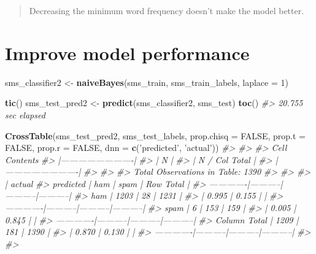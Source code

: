 \documentclass[]{book}
\newenvironment{Shaded}{\begin{snugshade}}{\end{snugshade}}
\newcommand{\CommentTok}[1]{\textcolor[rgb]{0.56,0.35,0.01}{\textit{#1}}}
\newcommand{\DataTypeTok}[1]{\textcolor[rgb]{0.13,0.29,0.53}{#1}}
\newcommand{\DecValTok}[1]{\textcolor[rgb]{0.00,0.00,0.81}{#1}}
\newcommand{\KeywordTok}[1]{\textcolor[rgb]{0.13,0.29,0.53}{\textbf{#1}}}
\newcommand{\NormalTok}[1]{#1}
\newcommand{\OtherTok}[1]{\textcolor[rgb]{0.56,0.35,0.01}{#1}}
\newcommand{\StringTok}[1]{\textcolor[rgb]{0.31,0.60,0.02}{#1}}
\begin{document}
\begin{quote}
Decreasing the minimum word frequency doesn't make the model better.
\end{quote}

\hypertarget{improve-model-performance}{%
\section{Improve model performance}\label{improve-model-performance}}

\begin{Shaded}
\begin{Highlighting}[]
\NormalTok{sms_classifier2 <-}\StringTok{ }\KeywordTok{naiveBayes}\NormalTok{(sms_train, sms_train_labels, }
                              \DataTypeTok{laplace =} \DecValTok{1}\NormalTok{)}
\end{Highlighting}
\end{Shaded}

\begin{Shaded}
\begin{Highlighting}[]
\KeywordTok{tic}\NormalTok{()}
\NormalTok{sms_test_pred2 <-}\StringTok{ }\KeywordTok{predict}\NormalTok{(sms_classifier2, sms_test)}
\KeywordTok{toc}\NormalTok{()}
\CommentTok{#> 20.755 sec elapsed}
\end{Highlighting}
\end{Shaded}

\begin{Shaded}
\begin{Highlighting}[]
\KeywordTok{CrossTable}\NormalTok{(sms_test_pred2, sms_test_labels,}
    \DataTypeTok{prop.chisq =} \OtherTok{FALSE}\NormalTok{, }\DataTypeTok{prop.t =} \OtherTok{FALSE}\NormalTok{, }\DataTypeTok{prop.r =} \OtherTok{FALSE}\NormalTok{,}
    \DataTypeTok{dnn =} \KeywordTok{c}\NormalTok{(}\StringTok{'predicted'}\NormalTok{, }\StringTok{'actual'}\NormalTok{))}
\CommentTok{#> }
\CommentTok{#>  }
\CommentTok{#>    Cell Contents}
\CommentTok{#> |-------------------------|}
\CommentTok{#> |                       N |}
\CommentTok{#> |           N / Col Total |}
\CommentTok{#> |-------------------------|}
\CommentTok{#> }
\CommentTok{#>  }
\CommentTok{#> Total Observations in Table:  1390 }
\CommentTok{#> }
\CommentTok{#>  }
\CommentTok{#>              | actual }
\CommentTok{#>    predicted |       ham |      spam | Row Total | }
\CommentTok{#> -------------|-----------|-----------|-----------|}
\CommentTok{#>          ham |      1203 |        28 |      1231 | }
\CommentTok{#>              |     0.995 |     0.155 |           | }
\CommentTok{#> -------------|-----------|-----------|-----------|}
\CommentTok{#>         spam |         6 |       153 |       159 | }
\CommentTok{#>              |     0.005 |     0.845 |           | }
\CommentTok{#> -------------|-----------|-----------|-----------|}
\CommentTok{#> Column Total |      1209 |       181 |      1390 | }
\CommentTok{#>              |     0.870 |     0.130 |           | }
\CommentTok{#> -------------|-----------|-----------|-----------|}
\CommentTok{#> }
\CommentTok{#> }
\end{Highlighting}
\end{Shaded}
\end{document}
